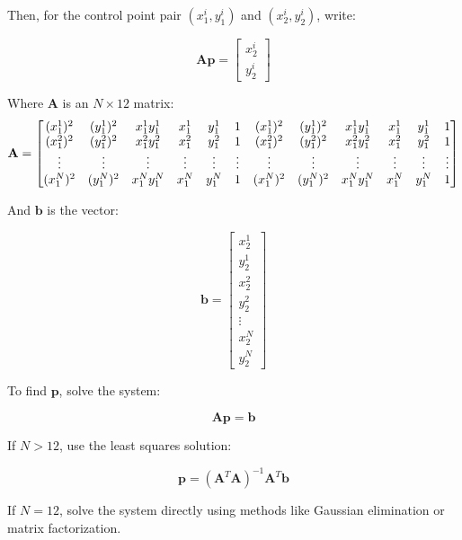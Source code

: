 \documentclass[a4paper,12pt]{article}
\begin{document}
Then, for the control point pair \((x_1^i, y_1^i)\) and \((x_2^i, y_2^i)\), write:

\[
\mathbf{A} \mathbf{p} = \begin{bmatrix}
x_2^i \\
y_2^i
\end{bmatrix}
\]

Where \(\mathbf{A}\) is an \(N \times 12\) matrix:
\[
\setcounter{MaxMatrixCols}{12}
\mathbf{A} = \begin{bmatrix}
(x_1^1)^2 & (y_1^1)^2 & x_1^1 y_1^1 & x_1^1 & y_1^1 & 1 & (x_1^1)^2 & (y_1^1)^2 & x_1^1 y_1^1 & x_1^1 & y_1^1 & 1 \\
(x_1^2)^2 & (y_1^2)^2 & x_1^2 y_1^2 & x_1^2 & y_1^2 & 1 & (x_1^2)^2 & (y_1^2)^2 & x_1^2 y_1^2 & x_1^2 & y_1^2 & 1 \\
\vdots & \vdots & \vdots & \vdots & \vdots & \vdots & \vdots & \vdots & \vdots & \vdots & \vdots & \vdots \\
(x_1^N)^2 & (y_1^N)^2 & x_1^N y_1^N & x_1^N & y_1^N & 1 & (x_1^N)^2 & (y_1^N)^2 & x_1^N y_1^N & x_1^N & y_1^N & 1
\end{bmatrix}
\]

And \(\mathbf{b}\) is the vector:

\[
\mathbf{b} = \begin{bmatrix}
x_2^1 \\
y_2^1 \\
x_2^2 \\
y_2^2 \\
\vdots \\
x_2^N \\
y_2^N
\end{bmatrix}
\]

To find \(\mathbf{p}\), solve the system:

\[
\mathbf{A} \mathbf{p} = \mathbf{b}
\]

If \(N > 12\), use the least squares solution:

\[
\mathbf{p} = (\mathbf{A}^T \mathbf{A})^{-1} \mathbf{A}^T \mathbf{b}
\]

If \(N = 12\), solve the system directly using methods like Gaussian elimination or matrix factorization.
\end{document}
